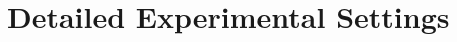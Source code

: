 \documentclass[11pt,a4paper]{article}
\newcommand{\bs}{\mathrm{s}}
\newcommand{\br}{\mathrm{r}}
\newcommand{\bo}{\mathrm{o}}
\begin{document}








\section{Detailed Experimental Settings}
\label{append:base}
\end{document}
